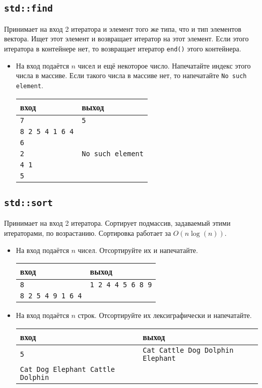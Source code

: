 \documentclass{article}
\begin{document}
\subsection*{\texttt{std::find}}
Принимает на вход 2 итератора и элемент того же типа, что и тип элементов вектора. Ищет этот элемент и возвращает итератор на этот элемент. Если этого итератора в контейнере нет, то возвращает итератор \texttt{end()} этого контейнера.

\begin{itemize}
\item На вход подаётся $n$ чисел и ещё некоторое число. Напечатайте индекс этого числа в массиве. Если такого числа в массиве нет, то напечатайте \texttt{No such element}.
\begin{center}
\begin{tabular}{ l | l }
 вход & выход \\ \hline
 \texttt{7} & \texttt{5}  \\ 
 \texttt{8 2 5 4 1 6 4} &  \\
 \texttt{6} &  \\ \hline
 \texttt{2} & \texttt{No such element}  \\ 
 \texttt{4 1} &  \\
 \texttt{5} &  \\
\end{tabular}
\end{center}
\end{itemize}

\subsection*{\texttt{std::sort}}
Принимает на вход 2 итератора. Сортирует подмассив, задаваемый этими итераторами, по возрастанию. Сортировка работает за $O(n \log(n))$.

\begin{itemize}
\item На вход подаётся $n$ чисел. Отсортируйте их и напечатайте.
\begin{center}
\begin{tabular}{ l | l }
 вход & выход \\ \hline
 \texttt{8} & \texttt{1 2 4 4 5 6 8 9}  \\ 
 \texttt{8 2 5 4 9 1 6 4} &  \\
\end{tabular}
\end{center}

\item На вход подаётся $n$ строк. Отсортируйте их лексиграфически и напечатайте.
\begin{center}
\begin{tabular}{ l | l }
 вход & выход \\ \hline
 \texttt{5} & \texttt{Cat Cattle Dog Dolphin Elephant}  \\ 
 \texttt{Cat Dog Elephant Cattle Dolphin } &  \\
\end{tabular}
\end{center}
\end{itemize}
\end{document}
